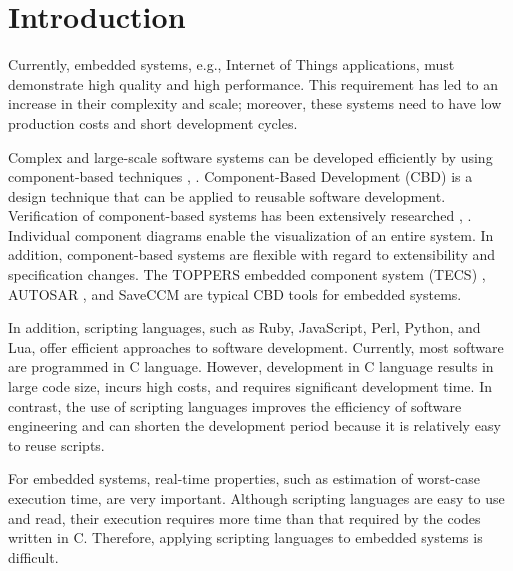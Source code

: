 \documentclass[S,R,E]{article/compsoft}
\begin{document}

\section{Introduction}
Currently, embedded systems, e.g., Internet of Things applications, must demonstrate high quality and high performance.
This requirement has led to an increase in their complexity and scale; moreover, these systems need to have low production costs and short development cycles.

Complex and large-scale software systems can be developed efficiently by using component-based techniques \cite{par:Crnkovic}, \cite{par:CBD}.
Component-Based Development (CBD) is a design technique that can be applied to reusable software development.
Verification of component-based systems has been extensively researched \cite{par:Blaming}, \cite{par:Verification}.
Individual component diagrams enable the visualization of an entire system.
In addition, component-based systems are flexible with regard to extensibility and specification changes.
The TOPPERS embedded component system (TECS) \cite{par:TECS}, AUTOSAR \cite{url:AUTOSAR}, and SaveCCM \cite{par:SAVEapproach} are typical CBD tools for embedded systems.

In addition, scripting languages, such as Ruby, JavaScript, Perl, Python, and Lua, offer efficient approaches to software development.
Currently, most software are programmed in C language.
However, development in C language results in large code size, incurs high costs, and requires significant development time.
In contrast, the use of scripting languages improves the efficiency of software engineering and can shorten the development period because it is relatively easy to reuse scripts. 

For embedded systems, real-time properties, such as estimation of worst-case execution time, are very important.
Although scripting languages are easy to use and read, their execution requires more time than that required by the codes written in C.
Therefore, applying scripting languages to embedded systems is difficult.
\end{document}
